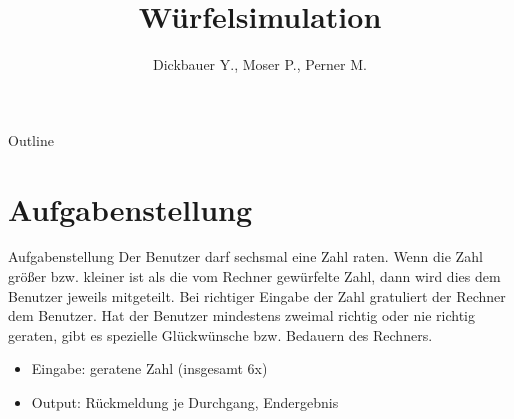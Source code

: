 

\title[BSP05 - Würfelsimulation]{Würfelsimulation}
\author{Dickbauer Y., Moser P., Perner M.}



\begin{frame}
  \titlepage
\end{frame}

\begin{frame}{Outline}
  \tableofcontents
\end{frame}

\section{Aufgabenstellung}
\begin{frame}{Aufgabenstellung}
Der Benutzer
darf sechsmal eine Zahl raten. Wenn die Zahl größer bzw. kleiner ist als die vom Rechner
gewürfelte Zahl, dann wird dies dem Benutzer jeweils mitgeteilt. Bei richtiger Eingabe
der Zahl gratuliert der Rechner dem Benutzer. Hat der Benutzer mindestens zweimal
richtig oder nie richtig geraten, gibt es spezielle Glückwünsche bzw. Bedauern des Rechners.

\begin{itemize}
  \item Eingabe: geratene Zahl (insgesamt 6x)
  \item Output: Rückmeldung je Durchgang, Endergebnis
\end{itemize}

\end{frame}

